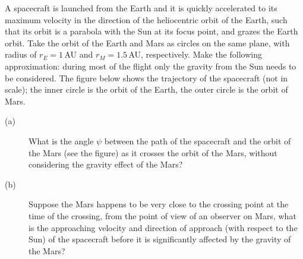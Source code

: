 A spacecraft is launched from the Earth and it is quickly accelerated to its
maximum velocity in the direction of the heliocentric orbit of the Earth, such
that its orbit is a parabola with the Sun at its focus point, and grazes the
Earth orbit. Take the orbit of the Earth and Mars as circles on the same plane,
with radius of $r_E = 1$\,AU and $r_M = 1.5$\,AU, respectively. Make the
following approximation: during most of the flight only the gravity from the
Sun needs to be considered. The figure below shows the trajectory of the
spacecraft (not in scale); the inner circle is the orbit of the Earth, the
outer circle is the orbit of Mars.


\begin{description}
\item[(a)] What is the angle $\psi$ between the path of the spacecraft and the
  orbit of the Mars (see the figure) as it crosses the orbit of the Mars,
  without considering the gravity effect of the Mars?
\item[(b)] Suppose the Mars happens to be very close to the crossing point at
  the time of the crossing, from the point of view of an observer on Mars, what
  is the approaching velocity and direction of approach (with respect to the
  Sun) of the spacecraft before it is significantly affected by the gravity of
  the Mars?
\end{description}
